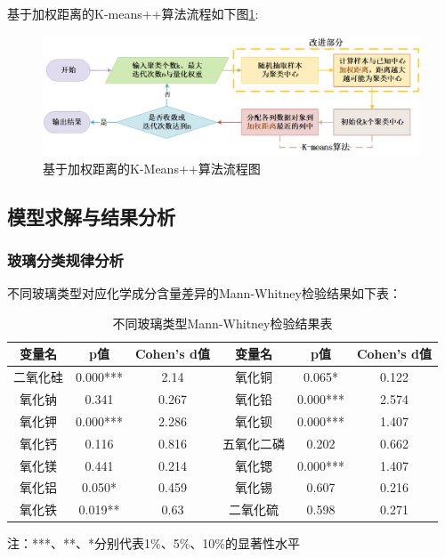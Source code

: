 \documentclass[withoutpreface,bwprint]{cumcmthesis} %
\begin{document}
基于加权距离的K-means++算法流程如下图\ref{julei}:
\begin{figure}[H]
  \centering
  \includegraphics[width=1\textwidth]{figure/聚类}
  \caption{基于加权距离的K-Means++算法流程图}
  \label{julei}
\end{figure}


\subsection{模型求解与结果分析}

\subsubsection{玻璃分类规律分析}

不同玻璃类型对应化学成分含量差异的Mann-Whitney检验结果如下表：

\begin{table}[H]
  \centering
  \caption{不同玻璃类型Mann-Whitney检验结果表}
  \begin{threeparttable}
  \begin{tabular}{cccccc}
    \toprule[1.5pt]
    变量名  & p值       & Cohen's d值 & 变量名   & p值       & Cohen's d值 \\ \hline
    二氧化硅 & 0.000*** & 2.14       & 氧化铜   & 0.065*   & 0.122      \\
    氧化钠  & 0.341    & 0.267      & 氧化铅   & 0.000*** & 2.574      \\
    氧化钾  & 0.000*** & 2.286      & 氧化钡   & 0.000*** & 1.407      \\
    氧化钙  & 0.116    & 0.816      & 五氧化二磷 & 0.202    & 0.662      \\
    氧化镁  & 0.441    & 0.214      & 氧化锶   & 0.000*** & 1.407      \\
    氧化铝  & 0.050*   & 0.459      & 氧化锡   & 0.607    & 0.216      \\
    氧化铁  & 0.019**  & 0.63       & 二氧化硫  & 0.598    & 0.271      \\ \bottomrule[1.5pt]
  \end{tabular}
\begin{tablenotes}
  \footnotesize
  \item 注：***、**、*分别代表1$\%$、5$\%$、10$\%$的显著性水平
\end{tablenotes}
\end{threeparttable}
\end{table}
\end{document}
